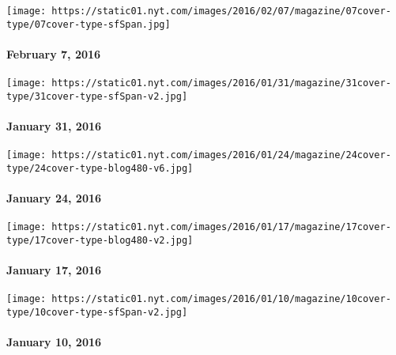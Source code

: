 \href{http://www.nytimes.com/indexes/2016/02/09/magazine/index.html}{}

\texttt{[image: https://static01.nyt.com/images/2016/02/07/magazine/07cover-type/07cover-type-sfSpan.jpg]}

\hypertarget{february-7-2016}{%
\paragraph{February 7, 2016}\label{february-7-2016}}

\href{http://www.nytimes.com/indexes/2016/01/31/magazine/index.html}{}

\texttt{[image: https://static01.nyt.com/images/2016/01/31/magazine/31cover-type/31cover-type-sfSpan-v2.jpg]}

\hypertarget{january-31-2016}{%
\paragraph{January 31, 2016}\label{january-31-2016}}

\href{http://www.nytimes.com/indexes/2016/01/24/magazine/index.html}{}

\texttt{[image: https://static01.nyt.com/images/2016/01/24/magazine/24cover-type/24cover-type-blog480-v6.jpg]}

\hypertarget{january-24-2016}{%
\paragraph{January 24, 2016}\label{january-24-2016}}

\href{http://www.nytimes.com/indexes/2016/01/17/magazine/index.html}{}

\texttt{[image: https://static01.nyt.com/images/2016/01/17/magazine/17cover-type/17cover-type-blog480-v2.jpg]}

\hypertarget{january-17-2016}{%
\paragraph{January 17, 2016}\label{january-17-2016}}

\href{http://www.nytimes.com/indexes/2016/01/10/magazine/index.html}{}

\texttt{[image: https://static01.nyt.com/images/2016/01/10/magazine/10cover-type/10cover-type-sfSpan-v2.jpg]}

\hypertarget{january-10-2016}{%
\paragraph{January 10, 2016}\label{january-10-2016}}


